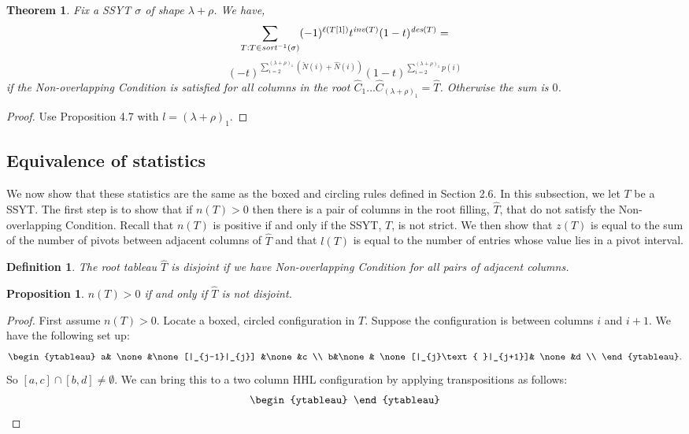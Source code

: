 \documentclass[11pt]{amsart}
\newtheorem{prop}{Proposition}[section]
\newtheorem{definition}{Definition}[section]
\newtheorem{theorem}{Theorem}[section]
\begin{document}
{\begin{theorem} Fix a SSYT $\sigma$ of shape $\lambda+\rho$. We have, 
\[
\sum_{T: T\in \emph{sort}^{-1}(\sigma)}(-1)^{\ell(T[1])}t^{\emph{inv}(T)}(1-t)^{\emph{des}(T)}=\]
\[ 
(-t)^{\sum_{i=2}^{(\lambda+\rho)_{1}}(\check{N}(i)+\hat{N}(i))}(1-t)^{\sum_{i=2}^{(\lambda+\rho)_{1}}p(i)} 
\]
if the Non-overlapping Condition is satisfied for all columns in the root $\widehat{C}_{1}\ldots\widehat{C}_{(\lambda+\rho)_{1}}=\widehat{T}$. Otherwise the sum is $0$. 
\end{theorem}
\begin{proof}
Use Proposition 4.7 with $l=(\lambda+\rho)_{1}$.
\end{proof}
\subsection{Equivalence of statistics} 
We now show that these statistics are the same as the boxed and circling rules defined in Section 2.6. In this subsection, we let $T$ be a SSYT. The first step is to show that if $n(T)>0$ then there is a pair of columns in the root filling, $\widehat{T}$, that do not satisfy the Non-overlapping Condition. Recall that $n(T)$ is positive if and only if the SSYT, $T$, is not strict. We then show that $z(T)$ is equal to the sum of the number of pivots between adjacent columns of $\widehat{T}$ and that $l(T)$ is equal to the number of entries whose value lies in a pivot interval. 
\begin{definition} The root tableau $\widehat{T}$ is \emph{disjoint} if we have Non-overlapping Condition for all pairs of adjacent columns. 
\end{definition}
\begin{prop}
$n(T)>0$ if and only if $\widehat{T}$ is not disjoint. 
\end{prop}
\begin{proof}
First assume $n(T)>0$. Locate a boxed, circled configuration in $T$. Suppose the configuration is between columns $i$ and $i+1$. We have the following set up:
\[
\begin{ytableau}
a& \none&\none[|_{j-1}|_{j}] &\none&c \\
b&\none& \none[|_{j}\text{ }|_{j+1}]& \none&d \\
\end{ytableau}.
\]
So $[a,c]\cap [b,d]\ne \emptyset$. We can bring this to a two column HHL configuration by applying transpositions as follows:
\[
\begin{ytableau}

\end{ytableau}\]
\end{proof}}
\end{document}
